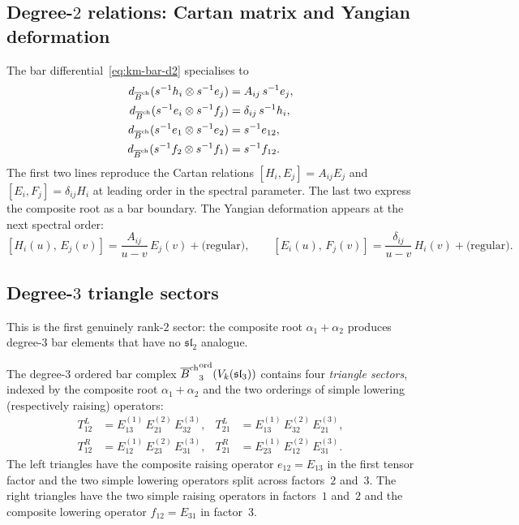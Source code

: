 \subsection{Degree-\texorpdfstring{$2$}{2} relations: Cartan matrix and Yangian deformation}

The bar differential~\eqref{eq:km-bar-d2} specialises to
\begin{align*}
d_{\overline{B}^{\mathrm{ch}}}(s^{-1}h_i\otimes s^{-1}e_j)
&=A_{ij}\,s^{-1}e_j,\\
d_{\overline{B}^{\mathrm{ch}}}(s^{-1}e_i\otimes s^{-1}f_j)
&=\delta_{ij}\,s^{-1}h_i,\\
d_{\overline{B}^{\mathrm{ch}}}(s^{-1}e_1\otimes s^{-1}e_2)
&=s^{-1}e_{12},\\
d_{\overline{B}^{\mathrm{ch}}}(s^{-1}f_2\otimes s^{-1}f_1)
&=s^{-1}f_{12}.
\end{align*}
The first two lines reproduce the Cartan relations
$[H_i,E_j]=A_{ij}E_j$ and $[E_i,F_j]=\delta_{ij}H_i$
at leading order in the spectral parameter. The last two express
the composite root as a bar boundary. The Yangian deformation
appears at the next spectral order:
\[
[H_i(u),\,E_j(v)]
=
\frac{A_{ij}}{u-v}\,E_j(v)+\text{(regular)},
\qquad
[E_i(u),\,F_j(v)]
=
\frac{\delta_{ij}}{u-v}\,H_i(v)+\text{(regular)}.
\]

\subsection{Degree-\texorpdfstring{$3$}{3} triangle sectors}

This is the first genuinely rank-$2$ sector: the composite root
$\alpha_1+\alpha_2$ produces degree-$3$ bar elements that
have no $\mathfrak{sl}_2$ analogue.

\begin{definition}
\label{def:sl3-triangle-sectors}
The degree-$3$ ordered bar complex
${\overline{B}^{\mathrm{ch}}}^{\mathrm{ord}}_3(V_k(\mathfrak{sl}_3))$
contains four \emph{triangle sectors}, indexed by the composite
root $\alpha_1+\alpha_2$ and the two orderings of simple lowering
(respectively raising) operators:
\begin{align*}
T^L_{12}&=E_{13}^{(1)}\,E_{21}^{(2)}\,E_{32}^{(3)},
&
T^L_{21}&=E_{13}^{(1)}\,E_{32}^{(2)}\,E_{21}^{(3)},\\
T^R_{12}&=E_{12}^{(1)}\,E_{23}^{(2)}\,E_{31}^{(3)},
&
T^R_{21}&=E_{23}^{(1)}\,E_{12}^{(2)}\,E_{31}^{(3)}.
\end{align*}
The left triangles have the composite raising operator $e_{12}=E_{13}$ in
the first tensor factor and the two simple lowering operators split
across factors~$2$ and~$3$. The right triangles have the two simple
raising operators in factors~$1$ and~$2$ and the composite lowering
operator $f_{12}=E_{31}$ in factor~$3$.
\end{definition}


